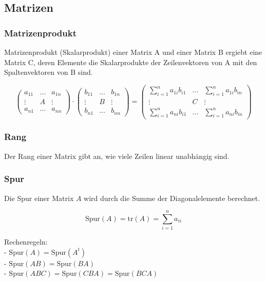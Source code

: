 	
\subsection{Matrizen}

\subsubsection{Matrizenprodukt}
Matrizenprodukt (Skalarprodukt) einer Matrix A und einer Matrix B ergiebt eine
Matrix C, deren Elemente die Skalarprodukte der Zeilenvektoren von A mit den
Spaltenvektoren von B sind.

\[
	\begin{pmatrix}
	a_{11} & \ldots & a_{1n} \\
	\vdots & A & \vdots \\
	a_{n1} & \ldots & a_{nn}
	\end{pmatrix} \cdot \begin{pmatrix} 
	b_{11} & \ldots & b_{1n} \\
	\vdots & B & \vdots \\
	b_{n1} & \ldots & b_{nn}
	\end{pmatrix} = \begin{pmatrix}
	\sum\limits_{i=1}^n a_{1i}b_{i1} & \ldots & \sum\limits_{i=1}^n a_{1i}b_{in}
	\\ \vdots & C & \vdots \\
	\sum\limits_{i=1}^n a_{ni}b_{i1} & \ldots & \sum\limits_{i=1}^n a_{ni}b_{in}
	\end{pmatrix}
\]


\subsubsection{Rang}
Der Rang einer Matrix gibt an, wie viele Zeilen linear unabhängig sind.


\subsubsection{Spur}
Die Spur einer Matrix $A$ wird durch die Summe der Diagonalelemente berechnet.

\[
	\mathrm{Spur}(A)=\mathrm{tr}(A)=\sum\limits_{i=1}^n a_{ii}
\]

Rechenregeln:\\
- $\mathrm{Spur}(A)=\mathrm{Spur}(A^t)$\\
- $\mathrm{Spur}(AB)=\mathrm{Spur}(BA)$\\
- $\mathrm{Spur}(ABC)=\mathrm{Spur}(CBA)=\mathrm{Spur}(BCA)$\\

